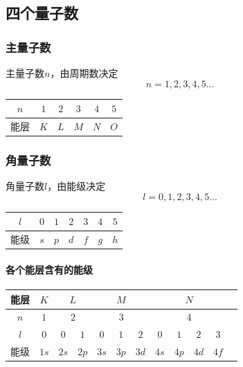 \documentclass[a4paper]{article}
\begin{document}
	\subsection{四个量子数}	
	\subsubsection{主量子数}
	主量子数$n$，由周期数决定
	$$n=1,2,3,4,5...$$
	\renewcommand\arraystretch{2}
	\begin{center}
	\begin{tabular}{|c|c|c|c|c|c|}
		\hline
		$n$ & $1$ & $2$ & $3$ & $4$ & $5$\\\hline
		能层 & $K$ & $L$ & $M$ & $N$ & $O$\\\hline
	\end{tabular}
	\end{center}
	\subsubsection{角量子数}
	角量子数$l$，由能级决定
	$$l=0,1,2,3,4,5...$$
	\begin{center}
	\begin{tabular}{|c|c|c|c|c|c|c|}
		\hline
		$l$ & $0$ & $1$ & $2$ & $3$ & $4$ & $5$\\\hline
		能级 & $s$ & $p$ & $d$ & $f$ & $g$ & $h$\\\hline
	\end{tabular}
	\end{center}
	\paragraph{各个能层含有的能级}
	\begin{center}
	\begin{tabular}{|c|c|c|c|c|c|c|c|c|c|c|c|}
		\hline
		能层 & $K$ & \multicolumn{2}{c|}{$L$} & \multicolumn{3}{c|}{$M$} & \multicolumn{4}{c|}{$N$}\\\hline
		$n$ & $1$ & \multicolumn{2}{c|}{$2$} & \multicolumn{3}{c|}{$3$} & \multicolumn{4}{c|}{$4$}\\\hline
		$l$ & $0$ & $0$ & $1$ & $0$ & $1$ & $2$ & $0$ & $1$ & $2$ & $3$\\\hline
		能级 & $1s$ & $2s$ & $2p$ & $3s$ & $3p$ & $3d$ & $4s$ & $4p$ & $4d$ & $4f$\\\hline
	\end{tabular}
	\end{center}
\end{document}
